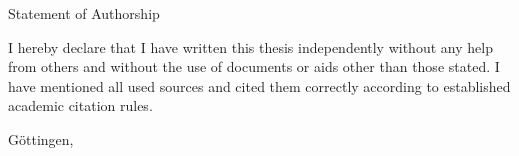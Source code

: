 
\thispagestyle{empty}
\null
\vspace{4cm}
\textnormal{\LARGE Statement of Authorship}\par
\vspace{1cm}
I hereby declare that I have written this thesis independently without any help from others and without the use of documents or aids other than those stated.
I have mentioned all used sources and cited them correctly according to established academic citation rules.

\vspace{0.5cm}

Göttingen, \mysubmissiondate
